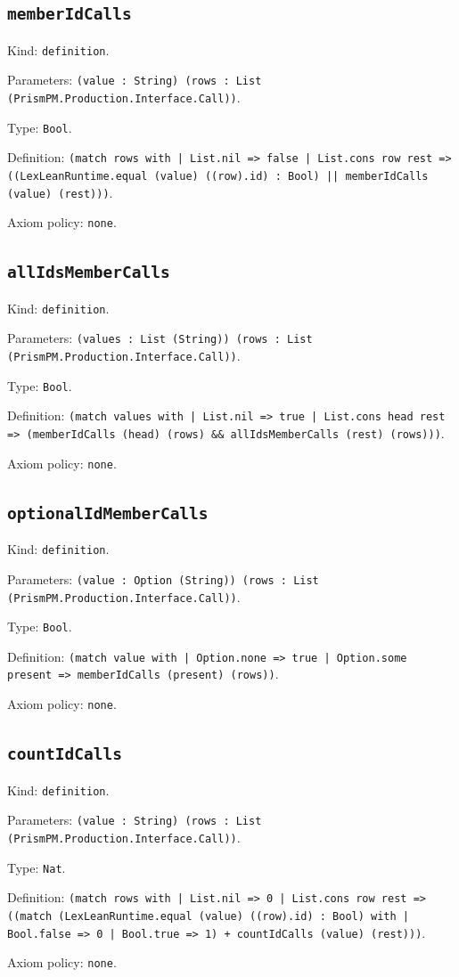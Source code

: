 \documentclass[11pt]{article}
\begin{document}
\subsection*{\texttt{memberIdCalls}}
\noindent Kind: \texttt{definition}.\par
\noindent Parameters: \texttt{(value : String) (rows : List (PrismPM.Production.Interface.Call))}.\par
\noindent Type: \texttt{Bool}.\par
\noindent Definition: \texttt{(match rows with | List.nil => false | List.cons row rest => ((LexLeanRuntime.equal (value) ((row).id) : Bool) || memberIdCalls (value) (rest)))}.\par
\noindent Axiom policy: \texttt{none}.\par
\subsection*{\texttt{allIdsMemberCalls}}
\noindent Kind: \texttt{definition}.\par
\noindent Parameters: \texttt{(values : List (String)) (rows : List (PrismPM.Production.Interface.Call))}.\par
\noindent Type: \texttt{Bool}.\par
\noindent Definition: \texttt{(match values with | List.nil => true | List.cons head rest => (memberIdCalls (head) (rows) \&\& allIdsMemberCalls (rest) (rows)))}.\par
\noindent Axiom policy: \texttt{none}.\par
\subsection*{\texttt{optionalIdMemberCalls}}
\noindent Kind: \texttt{definition}.\par
\noindent Parameters: \texttt{(value : Option (String)) (rows : List (PrismPM.Production.Interface.Call))}.\par
\noindent Type: \texttt{Bool}.\par
\noindent Definition: \texttt{(match value with | Option.none => true | Option.some present => memberIdCalls (present) (rows))}.\par
\noindent Axiom policy: \texttt{none}.\par
\subsection*{\texttt{countIdCalls}}
\noindent Kind: \texttt{definition}.\par
\noindent Parameters: \texttt{(value : String) (rows : List (PrismPM.Production.Interface.Call))}.\par
\noindent Type: \texttt{Nat}.\par
\noindent Definition: \texttt{(match rows with | List.nil => 0 | List.cons row rest => ((match (LexLeanRuntime.equal (value) ((row).id) : Bool) with | Bool.false => 0 | Bool.true => 1) + countIdCalls (value) (rest)))}.\par
\noindent Axiom policy: \texttt{none}.\par
\end{document}
